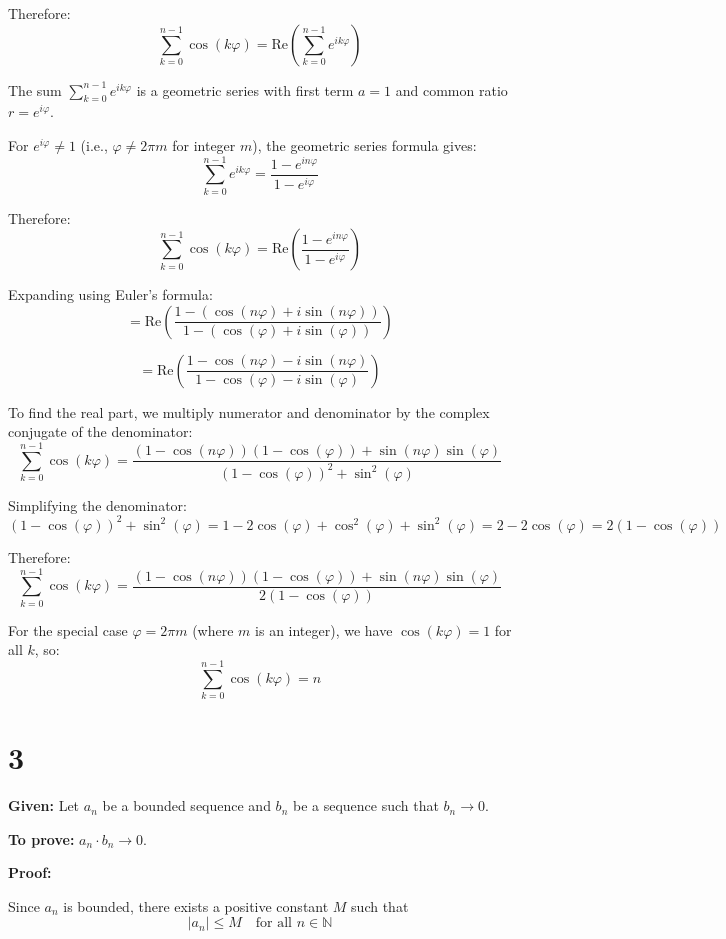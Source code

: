 \documentclass[12pt,a4paper]{article}
\theoremstyle{definition}
\theoremstyle{remark}
\begin{document}
Therefore:
$$\sum_{k=0}^{n-1} \cos(k\varphi) = \text{Re}\left(\sum_{k=0}^{n-1} e^{ik\varphi}\right)$$

The sum $\sum_{k=0}^{n-1} e^{ik\varphi}$ is a geometric series with first term $a = 1$ and common ratio $r = e^{i\varphi}$.

For $e^{i\varphi} \neq 1$ (i.e., $\varphi \neq 2\pi m$ for integer $m$), the geometric series formula gives:
$$\sum_{k=0}^{n-1} e^{ik\varphi} = \frac{1 - e^{in\varphi}}{1 - e^{i\varphi}}$$

Therefore:
$$\sum_{k=0}^{n-1} \cos(k\varphi) = \text{Re}\left(\frac{1 - e^{in\varphi}}{1 - e^{i\varphi}}\right)$$

Expanding using Euler's formula:
$$= \text{Re}\left(\frac{1 - (\cos(n\varphi) + i\sin(n\varphi))}{1 - (\cos(\varphi) + i\sin(\varphi))}\right)$$

$$= \text{Re}\left(\frac{1 - \cos(n\varphi) - i\sin(n\varphi)}{1 - \cos(\varphi) - i\sin(\varphi)}\right)$$

To find the real part, we multiply numerator and denominator by the complex conjugate of the denominator:
$$\sum_{k=0}^{n-1} \cos(k\varphi) = \frac{(1 - \cos(n\varphi))(1 - \cos(\varphi)) + \sin(n\varphi)\sin(\varphi)}{(1 - \cos(\varphi))^2 + \sin^2(\varphi)}$$

Simplifying the denominator:
$$(1 - \cos(\varphi))^2 + \sin^2(\varphi) = 1 - 2\cos(\varphi) + \cos^2(\varphi) + \sin^2(\varphi) = 2 - 2\cos(\varphi) = 2(1 - \cos(\varphi))$$

Therefore:
$$\sum_{k=0}^{n-1} \cos(k\varphi) = \frac{(1 - \cos(n\varphi))(1 - \cos(\varphi)) + \sin(n\varphi)\sin(\varphi)}{2(1 - \cos(\varphi))}$$

For the special case $\varphi = 2\pi m$ (where $m$ is an integer), we have $\cos(k\varphi) = 1$ for all $k$, so:
$$\sum_{k=0}^{n-1} \cos(k\varphi) = n$$



\section*{3}


\textbf{Given:} Let $a_n$ be a bounded sequence and $b_n$ be a sequence such that $b_n \to 0$.

\textbf{To prove:} $a_n \cdot b_n \to 0$.

\textbf{Proof:}

Since $a_n$ is bounded, there exists a positive constant $M$ such that
$$|a_n| \leq M \quad \text{for all } n \in \mathbb{N}$$
\end{document}
